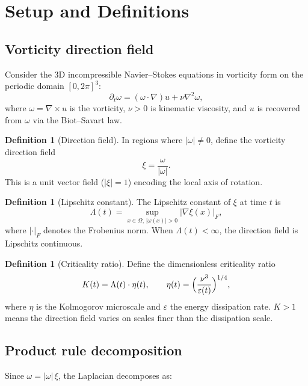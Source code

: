 \documentclass[11pt,a4paper]{article}
\theoremstyle{definition}
\newtheorem{definition}[theorem]{Definition}
\newcommand{\NS}{Navier--Stokes}
\newcommand{\grad}{\nabla}
\newcommand{\lapl}{\nabla^2}
\newcommand{\abs}[1]{\lvert #1 \rvert}
\begin{document}
\section{Setup and Definitions}\label{sec:setup}

\subsection{Vorticity direction field}

Consider the 3D incompressible \NS{} equations in vorticity form on
the periodic domain $[0,2\pi]^3$:
\begin{equation}\label{eq:vort}
  \partial_t\omega = (\omega\cdot\grad)u + \nu\lapl\omega,
\end{equation}
where $\omega = \grad\times u$ is the vorticity, $\nu>0$ is
kinematic viscosity, and $u$ is recovered from $\omega$ via the
Biot--Savart law.

\begin{definition}[Direction field]
In regions where $\abs{\omega}\neq 0$, define the vorticity direction
field
\[
  \xi = \frac{\omega}{\abs{\omega}}.
\]
This is a unit vector field ($\abs{\xi}=1$) encoding the local axis
of rotation.
\end{definition}

\begin{definition}[Lipschitz constant]
The Lipschitz constant of $\xi$ at time $t$ is
\[
  \Lambda(t) = \sup_{x\in\Omega,\,\abs{\omega(x)}>0}
    \abs{\grad\xi(x)}_F,
\]
where $\abs{\cdot}_F$ denotes the Frobenius norm.  When
$\Lambda(t)<\infty$, the direction field is Lipschitz continuous.
\end{definition}

\begin{definition}[Criticality ratio]\label{def:K}
Define the dimensionless criticality ratio
\[
  K(t) = \Lambda(t)\cdot\eta(t),
  \qquad
  \eta(t) = \Bigl(\frac{\nu^3}{\varepsilon(t)}\Bigr)^{1/4},
\]
where $\eta$ is the Kolmogorov microscale and $\varepsilon$ the
energy dissipation rate.  $K>1$ means the direction field varies on
scales finer than the dissipation scale.
\end{definition}

\subsection{Product rule decomposition}

Since $\omega = \abs{\omega}\,\xi$, the Laplacian decomposes as:
\end{document}
